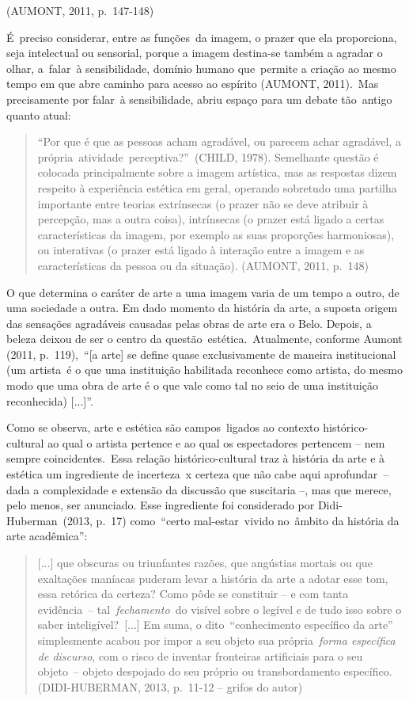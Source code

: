 \documentclass[
  letterpaper,
]{scrbook}
\begin{document}
(AUMONT, 2011, p.~147-148) ~

É~preciso considerar, entre as funções~da imagem, o prazer que ela
proporciona, seja intelectual ou sensorial, porque a imagem destina-se
também a agradar o olhar, a~falar~à sensibilidade, domínio humano
que~permite a criação ao mesmo tempo em que abre caminho para acesso ao
espírito (AUMONT, 2011).~Mas precisamente por falar~à sensibilidade,
abriu espaço para um debate tão~antigo quanto atual:~ ~

\begin{quote}
``Por que é que as pessoas acham agradável, ou parecem achar agradável,
a própria~atividade~perceptiva?''~(CHILD, 1978). Semelhante questão é
colocada principalmente sobre a imagem artística, mas as respostas dizem
respeito à experiência estética em geral, operando sobretudo uma
partilha importante entre teorias extrínsecas (o prazer não se deve
atribuir à percepção, mas a outra coisa), intrínsecas (o prazer está
ligado a certas características da imagem, por exemplo as suas
proporções harmoniosas), ou interativas (o prazer está ligado à
interação entre a imagem e as características da pessoa ou da situação).
(AUMONT, 2011, p.~148)~ ~
\end{quote}

O que determina o caráter de arte a uma imagem varia de um tempo a
outro, de uma sociedade a outra. Em dado momento da história da arte, a
suposta origem das sensações agradáveis causadas pelas obras de arte era
o Belo. Depois, a beleza deixou de ser o centro da
questão~estética.~Atualmente, conforme Aumont (2011, p.~119),~``{[}a
arte{]} se define quase exclusivamente de maneira institucional (um
artista~é o que uma instituição habilitada reconhece como artista, do
mesmo modo que uma obra de arte é o que vale como tal no seio de uma
instituição reconhecida) {[}...{]}''.~

Como se observa, arte e estética são campos~ligados ao contexto
histórico-cultural ao qual o artista pertence e ao qual os espectadores
pertencem -- nem sempre coincidentes.~Essa relação histórico-cultural
traz à história da arte e à estética um ingrediente de incerteza~x
certeza que não cabe aqui aprofundar~-- dada a complexidade e extensão
da discussão que suscitaria --, mas que merece, pelo menos, ser
anunciado. Esse ingrediente foi considerado por Didi-Huberman~(2013,
p.~17) como~``certo mal-estar~vivido no~âmbito da história da arte
acadêmica'':~ ~

\begin{quote}
{[}...{]} que obscuras ou triunfantes razões, que angústias mortais ou
que exaltações maníacas puderam levar a história da arte a adotar esse
tom, essa retórica da certeza? Como pôde se constituir -- e com tanta
evidência~-- tal~\emph{fechamento~}do visível sobre o legível e de tudo
isso sobre o saber inteligível?~{[}...{]} Em suma, o dito~``conhecimento
específico da arte'' simplesmente acabou por impor a seu objeto sua
própria~\emph{forma específica de discurso}, com o risco de inventar
fronteiras artificiais para o seu objeto~-- objeto despojado do seu
próprio ou transbordamento específico. (DIDI-HUBERMAN, 2013, p.~11-12 --
grifos do autor)~ ~
\end{quote}
\end{document}
